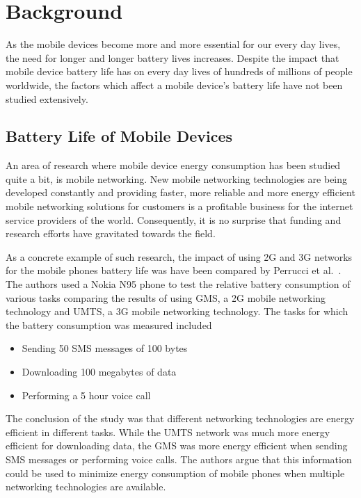 \section{Background}

As the mobile devices become more and more essential for our every day lives, the need for longer and longer battery lives increases. Despite the impact that mobile device battery life has on every day lives of hundreds of millions of people worldwide, the factors which affect a mobile device's battery life have not been studied extensively.        

\subsection{Battery Life of Mobile Devices}
An area of research where mobile device energy consumption has been studied quite a bit, is mobile networking. New mobile networking technologies are being developed constantly and providing faster, more reliable and more energy efficient mobile networking solutions for customers is a profitable business for the internet service providers of the world. Consequently, it is no surprise that funding and research efforts have gravitated towards the field.  

As a concrete example of such research, the impact of using 2G and 3G networks for the mobile phones battery life was have been compared by Perrucci et al.~\cite{5357972}. The authors used a Nokia N95 phone to test the relative battery consumption of various tasks comparing the results of using GMS, a 2G mobile networking technology and UMTS, a 3G mobile networking technology. The tasks for which the battery consumption was measured included 

\begin{itemize}
\item Sending 50 SMS messages of 100 bytes
\item Downloading 100 megabytes of data
\item Performing a 5 hour voice call 
\end{itemize} 

The conclusion of the study was that different networking technologies are energy efficient in different tasks. While the UMTS network was much more energy efficient for downloading data, the GMS was more energy efficient when sending SMS messages or performing voice calls. The authors argue that this information could be used to minimize energy consumption of mobile phones when multiple networking technologies are available.       

